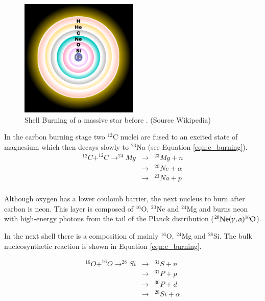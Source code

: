 \begin{figure}[htbp] %
   \centering
   \includegraphics[width=0.5\textwidth]{chapter_intro/plots/fusion_shells.pdf} 
   \caption{Shell Burning of a massive star before . (Source  Wikipedia)}
   \label{fig:fusion_shells}
\end{figure}


In the carbon burning stage two $^{12}$C nuclei are fused to an excited state of magnesium which then decays slowly to $^{23}$Na (see Equation \ref{eqn:c_burning}).
\begin{eqnarray}
^{12}C+^{12}C\rightarrow^{24}Mg&\rightarrow&^{23}Mg+n \nonumber \\
	&\rightarrow&^{20}Ne + \alpha \nonumber \\
	&\rightarrow&^{23}Na +p \nonumber \\
	\label{eqn:c_burning}
\end{eqnarray}

Although oxygen has a lower coulomb barrier, the next nucleus to burn after carbon is neon. This layer is composed of  $^{16}$O, $^{20}$Ne and $^{24}$Mg and burns neon with high-energy photons from the tail of the Planck distribution ($\rm ^{20}Ne(\gamma,\alpha)^{16}O$). 

In the next shell there is a composition of mainly $^{16}$O, $^{24}$Mg and $^{28}$Si. The bulk nucleosynthetic reaction is shown in Equation \ref{eqn:c_burning}. 

\begin{eqnarray}
^{16}O+^{16}O\rightarrow^{28}Si&\rightarrow&^{31}S+n \nonumber \\
	&\rightarrow&^{31}P + p \nonumber \\
	&\rightarrow&^{30}P + d \nonumber \\
	&\rightarrow&^{28}Si + \alpha \nonumber \\
	\label{eqn:c_burning}
\end{eqnarray}

